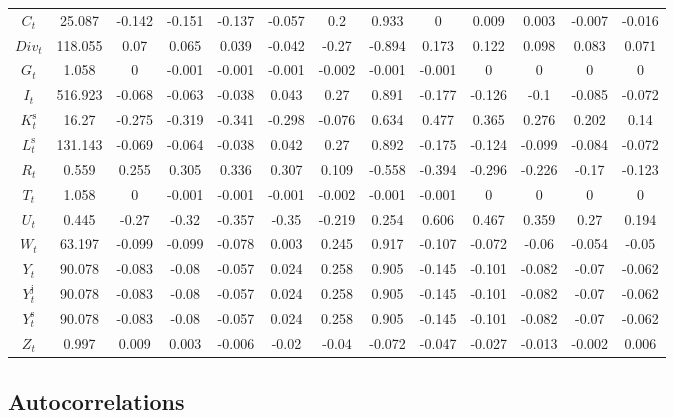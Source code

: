 \begin{tabular}{c|c|c|c|c|c|c|c|c|c|c|c|c|}
$C_{t}$ & 25.087 & -0.142 & -0.151 & -0.137 & -0.057 & 0.2 & 0.933 & 0 & 0.009 & 0.003 & -0.007 & -0.016 \\
${D\!i\!v}_{t}$ & 118.055 & 0.07 & 0.065 & 0.039 & -0.042 & -0.27 & -0.894 & 0.173 & 0.122 & 0.098 & 0.083 & 0.071 \\
$G_{t}$ & 1.058 & 0 & -0.001 & -0.001 & -0.001 & -0.002 & -0.001 & -0.001 & 0 & 0 & 0 & 0 \\
$I_{t}$ & 516.923 & -0.068 & -0.063 & -0.038 & 0.043 & 0.27 & 0.891 & -0.177 & -0.126 & -0.1 & -0.085 & -0.072 \\
$K^{\mathrm{s}}_{t}$ & 16.27 & -0.275 & -0.319 & -0.341 & -0.298 & -0.076 & 0.634 & 0.477 & 0.365 & 0.276 & 0.202 & 0.14 \\
$L^{\mathrm{s}}_{t}$ & 131.143 & -0.069 & -0.064 & -0.038 & 0.042 & 0.27 & 0.892 & -0.175 & -0.124 & -0.099 & -0.084 & -0.072 \\
$R_{t}$ & 0.559 & 0.255 & 0.305 & 0.336 & 0.307 & 0.109 & -0.558 & -0.394 & -0.296 & -0.226 & -0.17 & -0.123 \\
$T_{t}$ & 1.058 & 0 & -0.001 & -0.001 & -0.001 & -0.002 & -0.001 & -0.001 & 0 & 0 & 0 & 0 \\
$U_{t}$ & 0.445 & -0.27 & -0.32 & -0.357 & -0.35 & -0.219 & 0.254 & 0.606 & 0.467 & 0.359 & 0.27 & 0.194 \\
$W_{t}$ & 63.197 & -0.099 & -0.099 & -0.078 & 0.003 & 0.245 & 0.917 & -0.107 & -0.072 & -0.06 & -0.054 & -0.05 \\
$Y_{t}$ & 90.078 & -0.083 & -0.08 & -0.057 & 0.024 & 0.258 & 0.905 & -0.145 & -0.101 & -0.082 & -0.07 & -0.062 \\
$Y^{\mathrm{j}}_{t}$ & 90.078 & -0.083 & -0.08 & -0.057 & 0.024 & 0.258 & 0.905 & -0.145 & -0.101 & -0.082 & -0.07 & -0.062 \\
$Y^{\mathrm{s}}_{t}$ & 90.078 & -0.083 & -0.08 & -0.057 & 0.024 & 0.258 & 0.905 & -0.145 & -0.101 & -0.082 & -0.07 & -0.062 \\
$Z_{t}$ & 0.997 & 0.009 & 0.003 & -0.006 & -0.02 & -0.04 & -0.072 & -0.047 & -0.027 & -0.013 & -0.002 & 0.006 \\
\hline
\end{tabular}


\subsection{Autocorrelations}

